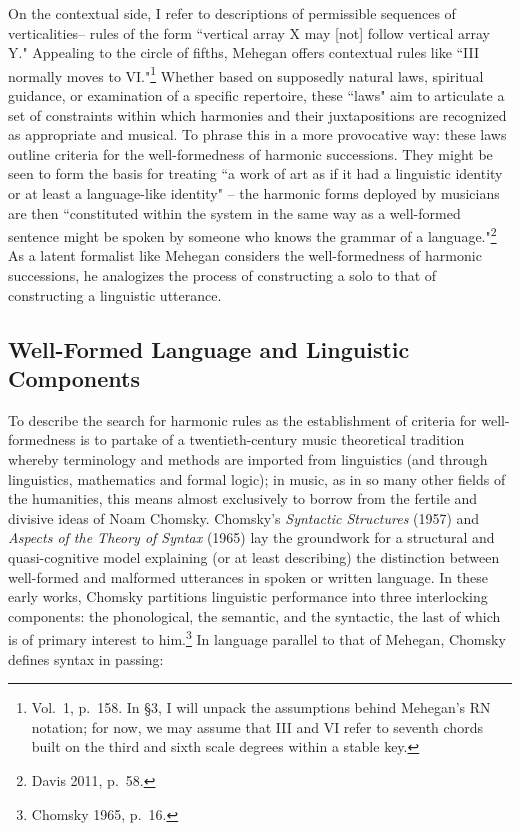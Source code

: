 On the contextual side, I refer to descriptions of permissible sequences of verticalities-- rules of the form ``vertical array X may [not] follow vertical array Y."  Appealing to the circle of fifths, Mehegan offers contextual rules like ``III normally moves to VI."\footnote{Vol.\ 1, p.\ 158.  In \S 3, I will unpack the assumptions behind Mehegan's RN notation; for now, we may assume that III and VI refer to seventh chords built on the third and sixth scale degrees within a stable key.}  Whether based on supposedly natural laws, spiritual guidance, or examination of a specific repertoire, these ``laws" aim to articulate a set of constraints within which harmonies and their juxtapositions are recognized as appropriate and musical.  To phrase this in a more provocative way: these laws outline criteria for the well-formedness of harmonic successions.  They might be seen to form the basis for treating ``a work of art as if it had a linguistic identity or at least a language-like identity" -- the harmonic forms deployed by musicians are then ``constituted within the system in the same way as a well-formed sentence might be spoken by someone who knows the grammar of a language."\footnote{Davis 2011, p.\ 58.}  As a latent formalist like Mehegan considers the well-formedness of harmonic successions, he analogizes the process of constructing a solo to that of constructing a linguistic utterance.

\subsection{Well-Formed Language and Linguistic Components}

To describe the search for harmonic rules as the establishment of criteria for well-formedness is to partake of a twentieth-century music theoretical tradition whereby terminology and methods are imported from linguistics (and through linguistics, mathematics and formal logic); in music, as in so many other fields of the humanities, this means almost exclusively to borrow from the fertile and divisive ideas of Noam Chomsky.  Chomsky's \emph{Syntactic Structures} (1957) and \emph{Aspects of the Theory of Syntax} (1965) lay the groundwork for a structural and quasi-cognitive model explaining (or at least describing) the distinction between well-formed and malformed utterances in spoken or written language.  In these early works, Chomsky partitions linguistic performance into three interlocking components: the phonological, the semantic, and the syntactic, the last of which is of primary interest to him.\footnote{Chomsky 1965, p.\ 16.}  In language parallel to that of Mehegan, Chomsky defines syntax in passing:

